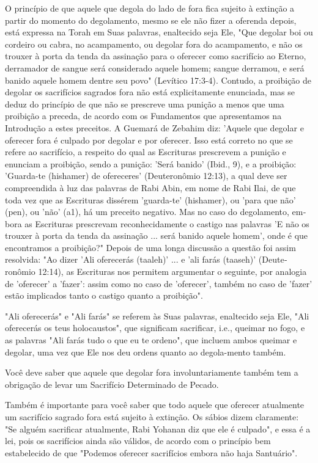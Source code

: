 \begin{itemize}
\begin{enumrate}
\begin{itemize}
\begin{itemize}
\begin{itemize}
O princípio de que aquele que degola do lado de fora fica sujeito à
extinção a partir do momento do degolamento, mesmo se ele não fizer a
oferen­da depois, está expressa na Torah em Suas palavras, enaltecido
seja Ele, "Que de­golar boi ou cordeiro ou cabra, no acampamento, ou
degolar fora do acampa­mento, e não os trouxer à porta da tenda da
assinação para o oferecer como sa­crifício ao Eterno, derramador de
sangue será considerado aquele homem; san­gue derramou, e será banido
aquele homem dentre seu povo" (Levítico 17:3-4). Contudo, a proibição de
degolar os sacrifícios sagrados fora não está explicita­mente enunciada,
mas se deduz do princípio de que não se prescreve uma puni­ção a menos
que uma proibição a preceda, de acordo com os Fundamentos que
apresentamos na Introdução a estes preceitos. A Guemará de Zebahim diz:
'Aquele que degolar e oferecer fora é culpado por degolar e por
oferecer. Isso está corre­to no que se refere ao sacrifício, a respeito
do qual as Escrituras prescrevem a punição 
e enunciam a proibição, sendo a punição: 'Será banido' (Ibid., 9),
e a proi­bição: 'Guarda-te (hishamer) de ofereceres' (Deuteronômio
12:13), a qual deve ser compreendida à luz das palavras de Rabi Abin, em
nome de Rabi Ilai, de que toda vez que as Escrituras dissérem
'guarda-te' (hishamer), ou 'para que não' (pen), ou 'não' (a1), há um
preceito negativo. Mas no caso do degolamento, em­bora as Escrituras
prescrevam reconhecidamente o castigo nas palavras 'E não os trouxer à
porta da tenda da assinação ... será banido aquele homem', onde é que
encontramos a proibição?" Depois de uma longa discussão a questão foi
assim resolvida: "Ao dizer 'Ali oferecerás (taaleh)' ... e 'ali farás
(taaseh)' (Deute­ronômio 12:14), as Escrituras nos permitem argumentar o
seguinte, por analo­gia de 'oferecer' a 'fazer': assim como no caso de
'oferecer', também no caso de 'fazer' estão implicados tanto o castigo
quanto a proibição".

"Ali oferecerás" e "Ali farás" se referem às Suas palavras, enaltecido
seja Ele, "Ali oferecerás os teus holocaustos", que significam
sacrificar, i.e., quei­mar no fogo, e as palavras "Ali farás tudo o que
eu te ordeno", que incluem ambos queimar e degolar, uma vez que Ele nos
deu ordens quanto ao degola-mento também.

Você deve saber que aquele que degolar fora involuntariamente tam­bém
tem a obrigação de levar um Sacrifício Determinado de Pecado.

Também é importante para você saber que todo aquele que ofere­cer
atualmente um sacrifício sagrado fora está sujeito à extinção. Os sábios
di­zem claramente: "Se alguém sacrificar atualmente, Rabi Yohanan diz
que ele é culpado", e essa é a lei, pois os sacrifícios ainda são
válidos, de acordo com o princípio bem estabelecido de que "Podemos
oferecer sacrifícios embora não haja Santuário".


\end{itemize}
\end{itemize}
\end{itemize}
\end{enumrate}
\end{itemize}

